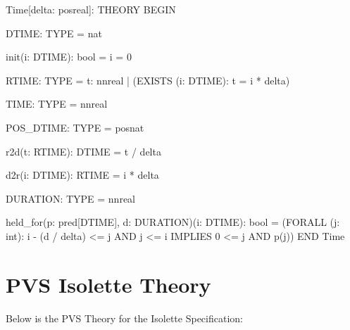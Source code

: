 \documentclass[fontsize=12pt,paper=letter,twoside]{scrartcl}
\begin{document}
\begin{pvs}
Time[delta: posreal]: THEORY
 BEGIN

  DTIME: TYPE = nat

  init(i: DTIME): bool = i = 0

  RTIME: TYPE = {t: nnreal | (EXISTS (i: DTIME): t = i * delta)}

  TIME: TYPE = nnreal

  POS_DTIME: TYPE = posnat

  r2d(t: RTIME): DTIME = t / delta

  d2r(i: DTIME): RTIME = i * delta

  DURATION: TYPE = nnreal

  held_for(p: pred[DTIME], d: DURATION)(i: DTIME): bool =
      (FORALL (j: int):
         i - (d / delta) <= j AND j <= i IMPLIES 0 <= j AND p(j))
 END Time	
\end{pvs}

\newpage
\section{PVS Isolette Theory}

Below is the PVS Theory for the Isolette Specification:\\
\end{document}
